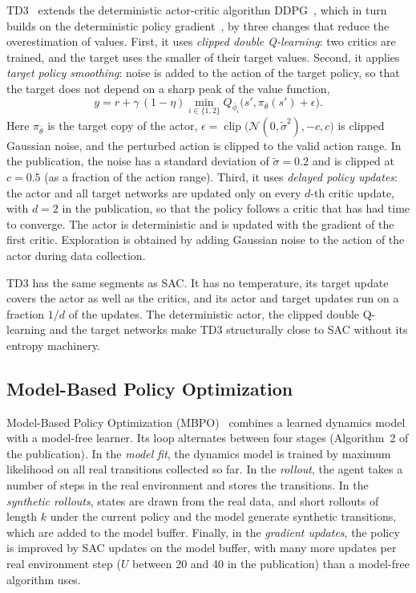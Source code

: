 TD3~\cite{fujimoto2018td3} extends the deterministic actor-critic algorithm DDPG~\cite{lillicrap2016ddpg}, which in turn builds on the deterministic policy gradient~\cite{silver2014dpg}, by three changes that reduce the overestimation of values.
First, it uses \emph{clipped double Q-learning}: two critics are trained, and the target uses the smaller of their target values.
Second, it applies \emph{target policy smoothing}: noise is added to the action of the target policy, so that the target does not depend on a sharp peak of the value function,
\begin{equation}
  y = r + \gamma\,(1-\eta) \min_{i \in \{1,2\}} Q_{\bar{\phi}_i}\bigl(s', \pi_{\bar{\theta}}(s') + \epsilon\bigr) .
  \label{eq:bg-td3-target}
\end{equation}
Here $\pi_{\bar{\theta}}$ is the target copy of the actor, $\epsilon = \operatorname{clip}\bigl(\mathcal{N}(0,\tilde{\sigma}^{2}), -c, c\bigr)$ is clipped Gaussian noise, and the perturbed action is clipped to the valid action range.
In the publication, the noise has a standard deviation of $\tilde{\sigma} = \num{0.2}$ and is clipped at $c = \num{0.5}$ (as a fraction of the action range).
Third, it uses \emph{delayed policy updates}: the actor and all target networks are updated only on every $d$-th critic update, with $d = 2$ in the publication, so that the policy follows a critic that has had time to converge.
The actor is deterministic and is updated with the gradient of the first critic.
Exploration is obtained by adding Gaussian noise to the action of the actor during data collection.

TD3 has the same segments as SAC.
It has no temperature, its target update covers the actor as well as the critics, and its actor and target updates run on a fraction $1/d$ of the updates.
The deterministic actor, the clipped double Q-learning and the target networks make TD3 structurally close to SAC without its entropy machinery.

\subsection{Model-Based Policy Optimization}\label{sec:algo-mbpo}

Model-Based Policy Optimization (MBPO)~\cite{janner2019mbpo} combines a learned dynamics model with a model-free learner.
Its loop alternates between four stages (Algorithm~2 of the publication).
In the \emph{model fit}, the dynamics model is trained by maximum likelihood on all real transitions collected so far.
In the \emph{rollout}, the agent takes a number of steps in the real environment and stores the transitions.
In the \emph{synthetic rollouts}, states are drawn from the real data, and short rollouts of length $k$ under the current policy and the model generate synthetic transitions, which are added to the model buffer.
Finally, in the \emph{gradient updates}, the policy is improved by SAC updates on the model buffer, with many more updates per real environment step ($U$ between \num{20} and \num{40} in the publication) than a model-free algorithm uses.

